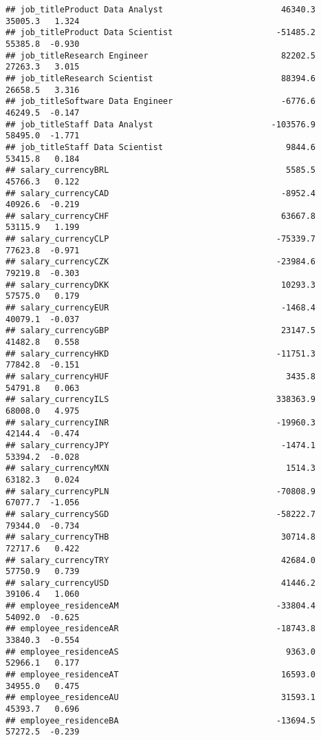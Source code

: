 \documentclass[
]{article}
\begin{document}
\begin{verbatim}
## job_titleProduct Data Analyst                        46340.3    35005.3   1.324
## job_titleProduct Data Scientist                     -51485.2    55385.8  -0.930
## job_titleResearch Engineer                           82202.5    27263.3   3.015
## job_titleResearch Scientist                          88394.6    26658.5   3.316
## job_titleSoftware Data Engineer                      -6776.6    46249.5  -0.147
## job_titleStaff Data Analyst                        -103576.9    58495.0  -1.771
## job_titleStaff Data Scientist                         9844.6    53415.8   0.184
## salary_currencyBRL                                    5585.5    45766.3   0.122
## salary_currencyCAD                                   -8952.4    40926.6  -0.219
## salary_currencyCHF                                   63667.8    53115.9   1.199
## salary_currencyCLP                                  -75339.7    77623.8  -0.971
## salary_currencyCZK                                  -23984.6    79219.8  -0.303
## salary_currencyDKK                                   10293.3    57575.0   0.179
## salary_currencyEUR                                   -1468.4    40079.1  -0.037
## salary_currencyGBP                                   23147.5    41482.8   0.558
## salary_currencyHKD                                  -11751.3    77842.8  -0.151
## salary_currencyHUF                                    3435.8    54791.8   0.063
## salary_currencyILS                                  338363.9    68008.0   4.975
## salary_currencyINR                                  -19960.3    42144.4  -0.474
## salary_currencyJPY                                   -1474.1    53394.2  -0.028
## salary_currencyMXN                                    1514.3    63182.3   0.024
## salary_currencyPLN                                  -70808.9    67077.7  -1.056
## salary_currencySGD                                  -58222.7    79344.0  -0.734
## salary_currencyTHB                                   30714.8    72717.6   0.422
## salary_currencyTRY                                   42684.0    57750.9   0.739
## salary_currencyUSD                                   41446.2    39106.4   1.060
## employee_residenceAM                                -33804.4    54092.0  -0.625
## employee_residenceAR                                -18743.8    33840.3  -0.554
## employee_residenceAS                                  9363.0    52966.1   0.177
## employee_residenceAT                                 16593.0    34955.0   0.475
## employee_residenceAU                                 31593.1    45393.7   0.696
## employee_residenceBA                                -13694.5    57272.5  -0.239

\end{verbatim}
\end{document}
